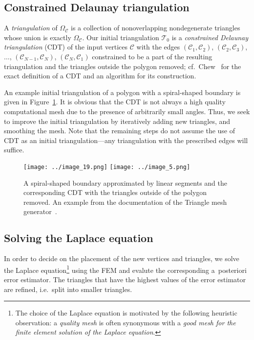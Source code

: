 \documentclass[12pt]{article}
\begin{document}
\subsection{Constrained Delaunay triangulation}
\label{sec:cdt}

A \emph{triangulation} of \(\Omega_{\mathcal{C}}\) is a
collection of nonoverlapping nondegenerate triangles whose union is exactly
\(\Omega_{\mathcal{C}}\).  Our initial triangulation \(\mathcal{T}_0\) is a
\emph{constrained Delaunay triangulation} (CDT) of the input vertices
\(\mathcal{C}\) with the edges \((\mathcal{C}_1, \mathcal{C}_2)\),
\((\mathcal{C}_2,\mathcal{C}_3)\), \(\dots\), \((\mathcal{C}_{N-1},
\mathcal{C}_N)\), \((\mathcal{C}_N, \mathcal{C}_1)\) constrained to be a part of
the resulting triangulation and the triangles outside the polygon removed;
cf.~Chew~\cite{Chew_1987} for the exact definition of a CDT and an algorithm for
its construction.

An example initial triangulation of a polygon with a spiral-shaped boundary is
given in Figure~\ref{fig:cdt}. It is obvious that the CDT is not always a high
quality computational mesh due to the presence of arbitrarily small angles.
Thus, we seek to improve the initial triangulation by iteratively adding new
triangles, and smoothing the mesh.  Note that the remaining steps do not assume
the use of CDT as an initial triangulation---any triangulation with the
prescribed edges will suffice.

\begin{figure}[htbp]
  \centering
  \texttt{[image: ../image\_19.png]}
  \texttt{[image: ../image\_5.png]}
\caption{A spiral-shaped boundary approximated by linear segments and the
  corresponding CDT with the triangles outside of the polygon removed.  An
  example from the documentation of the Triangle mesh
  generator~\cite{shewchuk1996triangle}.}
\label{fig:cdt}
\end{figure}

\subsection{Solving the Laplace equation}
\label{sec:poisson}

In order to decide on the placement of the new vertices and triangles, we solve
the Laplace equation\footnote{The choice of the Laplace equation is motivated by
the following heuristic observation: a \emph{quality mesh} is often synonymous
with a \emph{good mesh for the finite element solution of the Laplace
equation}.} using the FEM and evalute the corresponding a~posteriori error
estimator.  The triangles that have the highest values of the error estimator
are refined, i.e.~split into smaller triangles.
\end{document}
